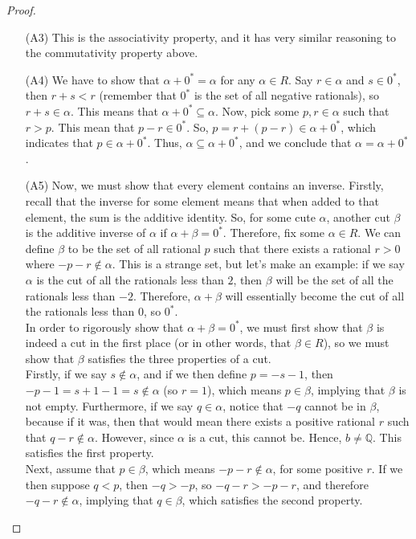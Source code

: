 \documentclass{article}
\theoremstyle{definition}
\begin{document}
\begin{section}
\begin{proof}
\begin{enumerate}
\begin{enumerate}
\item[(A3)] This is the associativity property, and it has very similar reasoning to the commutativity property above.
\item[(A4)] We have to show that $\alpha + 0^* = \alpha$ for any $\alpha \in R$. Say $r \in \alpha$ and $s \in 0^*$, then $r+s < r$ (remember that $0^*$ is the set of all negative rationals), so $r+s \in\alpha$. This means that $\alpha+0^* \subseteq \alpha$. Now, pick some $p,r \in \alpha$ such that $r > p$. This mean that $p-r \in 0^*$. So, $p = r + (p-r) \in \alpha + 0^*$, which indicates that $p \in \alpha + 0^*$. Thus, $\alpha \subseteq \alpha + 0^*$, and we conclude that $\alpha = \alpha + 0^*$.
\item[(A5)] Now, we must show that every element contains an inverse. Firstly, recall that the inverse for some element means that when added to that element, the sum is the additive identity. So, for some cute $\alpha$, another cut $\beta$ is the additive inverse of $\alpha$ if $\alpha + \beta= 0^*$. Therefore, fix some $\alpha \in R$. We can define $\beta$ to be the set of all rational $p$ such that there exists a rational $r > 0$ where $-p-r \not \in \alpha$. This is a strange set, but let's make an example: if we say $\alpha$ is the cut of all the rationals less than $2$, then $\beta$ will be the set of all the rationals less than $-2$. Therefore, $\alpha + \beta$ will essentially become the cut of all the rationals less than $0$, so $0^*$. \\
In order to rigorously show that $\alpha + \beta = 0^*$, we must first show that $\beta$ is indeed a cut in the first place (or in other words, that $\beta \in R$), so we must show that $\beta$ satisfies the three properties of a cut. \\
 Firstly, if we say $s \not\in\alpha$, and if we then define $p = -s-1$, then $-p-1 = s + 1 - 1 = s \not\in\alpha$ (so $r = 1$), which means $p \in \beta$, implying that $\beta$ is not empty. Furthermore, if we say $q \in \alpha$, notice that $-q$ cannot be in $\beta$, because if it was, then that would mean there exists a positive rational $r$ such that $q - r \not\in\alpha$. However, since $\alpha$ is a cut, this cannot be. Hence, $b \neq \mathbb{Q}$. This satisfies the first property. \\
Next, assume that $p\in\beta$, which means $-p-r \not\in\alpha$, for some positive $r$. If we then suppose $q < p$, then $-q > -p$, so $-q-r > -p-r$, and therefore $-q-r \not\in\alpha$, implying that $q \in \beta$, which satisfies the second property. \\

\end{enumerate}
\end{enumerate}
\end{proof}
\end{section}
\end{document}
